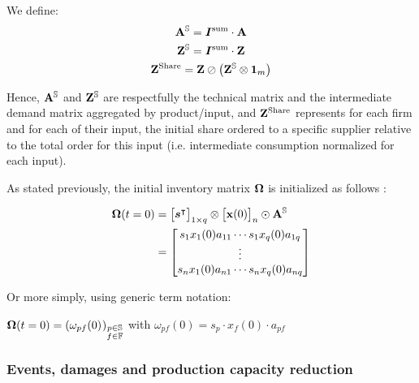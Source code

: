 We define:
\begin{gather*}
  \mathbf{A}^{\mathbb{S}} = \bm{I^{\textrm{sum}}} \cdot  \mathbf{A}\\
  \mathbf{Z}^{\mathbb{S}} = \bm{I^{\textrm{sum}}} \cdot  \mathbf{Z}\\
  \mathbf{Z}^{\textrm{Share}} =  \mathbf{Z} \oslash \left ( \mathbf{Z}^{\mathbb{S}} \otimes
    \bm{1}_m \right )
\end{gather*}

Hence, $\mathbf{A}^{\mathbb{S}}$ and $\mathbf{Z}^{\mathbb{S}}$ are respectfully the
technical matrix and the intermediate demand matrix aggregated by
product/input, and $\mathbf{Z}^{\textrm{Share}}$ represents for each firm and for each of
their input, the initial share ordered to a specific supplier relative to the
total order for this input (i.e. intermediate consumption normalized for each
input).

As stated previously, the initial inventory matrix $\mathbf{\Omega}$ is initialized as follows :

\begin{equation*}
  \begin{aligned}
    \mathbf{\Omega}(t=0) & =
                  \begin{bmatrix}\bm{s}^\intercal\end{bmatrix}_{1 \times q}
                  \otimes
                  \begin{bmatrix} \mathbf{x}(0) \end{bmatrix}_{n} \odot \mathbf{A}^{\mathbb{S}} \\
                & =  \begin{bmatrix} s_1 x_1(0) a_{11} \cdots s_1 x_{q}(0) a_{1q}\\ \vdots\\ s_n x_{1}(0) a_{n1} \cdots s_n x_{q}(0) a_{nq} \end{bmatrix} 
  \end{aligned}
\end{equation*}

Or more simply, using generic term notation:

\begin{center}
  $\ioinv(t=0) = \mdefentry{\omega}[0][p][\sectorsset][f][\firmsset][][]$
  with $\omega_{pf}(0) = s_p \cdot x_{f}(0) \cdot a_{pf}$
\end{center}



\subsubsection{Events, damages and production capacity reduction}
\label{par:damages_sh}

